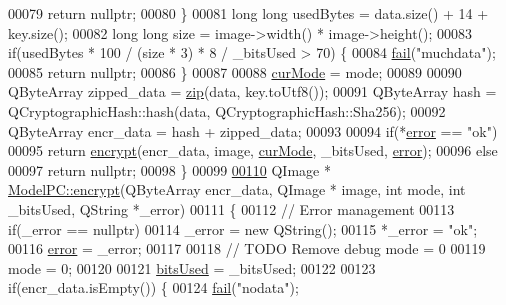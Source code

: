 \begin{DoxyCode}
00079         \textcolor{keywordflow}{return} \textcolor{keyword}{nullptr};
00080     \}
00081     \textcolor{keywordtype}{long} \textcolor{keywordtype}{long} usedBytes = data.size() + 14 + key.size();
00082     \textcolor{keywordtype}{long} \textcolor{keywordtype}{long} size = image->width() * image->height();
00083     \textcolor{keywordflow}{if}(usedBytes * 100 / (size * 3) * 8 / \_bitsUsed > 70) \{
00084         \hyperlink{class_model_p_c_a47464b59b7e37fcee25e55475708aabd}{fail}(\textcolor{stringliteral}{"muchdata"});
00085         \textcolor{keywordflow}{return} \textcolor{keyword}{nullptr};
00086     \}
00087 
00088     \hyperlink{class_model_p_c_ad74974ac236182c1d6d2cf0729fac3dd}{curMode} = mode;
00089 
00090     QByteArray zipped\_data = \hyperlink{class_model_p_c_afebbbfa4b07deba4f68fc6dfb50f353f}{zip}(data, key.toUtf8());
00091     QByteArray hash = QCryptographicHash::hash(data, QCryptographicHash::Sha256);
00092     QByteArray encr\_data = hash + zipped\_data;
00093 
00094     \textcolor{keywordflow}{if}(*\hyperlink{class_model_p_c_a4e5a9c0ca1f06fe5bc478b6bf248c37c}{error} == \textcolor{stringliteral}{"ok"})
00095         \textcolor{keywordflow}{return} \hyperlink{class_model_p_c_a48667f5b1a547d03a3def2d3db5a220f}{encrypt}(encr\_data, image, \hyperlink{class_model_p_c_ad74974ac236182c1d6d2cf0729fac3dd}{curMode}, \_bitsUsed, \hyperlink{class_model_p_c_a4e5a9c0ca1f06fe5bc478b6bf248c37c}{error});
00096     \textcolor{keywordflow}{else}
00097         \textcolor{keywordflow}{return} \textcolor{keyword}{nullptr};
00098 \}
00099 
\hypertarget{modelpc_8cpp_source_l00110}{}\hyperlink{class_model_p_c_a48667f5b1a547d03a3def2d3db5a220f}{00110} QImage * \hyperlink{class_model_p_c_a48667f5b1a547d03a3def2d3db5a220f}{ModelPC::encrypt}(QByteArray encr\_data, QImage * image, \textcolor{keywordtype}{int} mode, \textcolor{keywordtype}{int} \_bitsUsed, 
      QString *\_error)
00111 \{
00112     \textcolor{comment}{// Error management}
00113     \textcolor{keywordflow}{if}(\_error == \textcolor{keyword}{nullptr})
00114         \_error = \textcolor{keyword}{new} QString();
00115     *\_error = \textcolor{stringliteral}{"ok"};
00116     \hyperlink{class_model_p_c_a4e5a9c0ca1f06fe5bc478b6bf248c37c}{error} = \_error;
00117 
00118     \textcolor{comment}{// TODO Remove debug mode = 0}
00119     mode = 0;
00120 
00121     \hyperlink{class_model_p_c_a655deb6a8afa94c7f4aadb3056989038}{bitsUsed} = \_bitsUsed;
00122 
00123     \textcolor{keywordflow}{if}(encr\_data.isEmpty()) \{
00124         \hyperlink{class_model_p_c_a47464b59b7e37fcee25e55475708aabd}{fail}(\textcolor{stringliteral}{"nodata"});

\end{DoxyCode}
